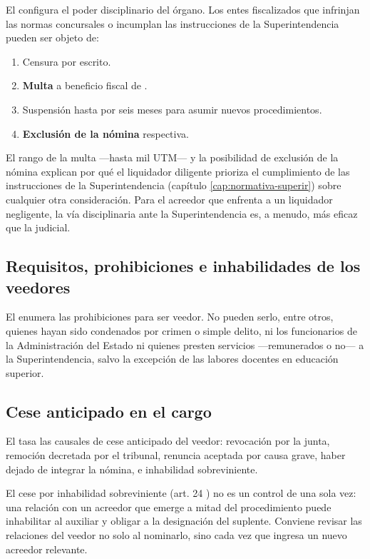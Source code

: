 El  configura el poder disciplinario del órgano. Los entes fiscalizados que
infrinjan las normas concursales o incumplan las instrucciones de la Superintendencia pueden
ser objeto de:

\begin{enumerate}
  \item Censura por escrito.
  \item \textbf{Multa} a beneficio fiscal de .
  \item Suspensión hasta por seis meses para asumir nuevos procedimientos.
  \item \textbf{Exclusión de la nómina} respectiva.
\end{enumerate}

\begin{foco}
El rango de la multa ---hasta mil UTM--- y la posibilidad de exclusión de la nómina explican
por qué el liquidador diligente prioriza el cumplimiento de las instrucciones de la
Superintendencia (capítulo \ref{cap:normativa-superir}) sobre cualquier otra consideración.
Para el acreedor que enfrenta a un liquidador negligente, la vía disciplinaria ante la
Superintendencia es, a menudo, más eficaz que la judicial.
\end{foco}

\subsection{Requisitos, prohibiciones e inhabilidades de los veedores}

El  enumera las prohibiciones para ser veedor. No pueden serlo, entre otros, quienes
hayan sido condenados por crimen o simple delito, ni los funcionarios de la Administración del
Estado ni quienes presten servicios ---remunerados o no--- a la Superintendencia, salvo la
excepción de las labores docentes en educación superior.

\subsection{Cese anticipado en el cargo}

El  tasa las causales de cese anticipado del veedor: revocación por la junta, remoción
decretada por el tribunal, renuncia aceptada por causa grave, haber dejado de integrar la
nómina, e inhabilidad sobreviniente.

\begin{practica}
El cese por inhabilidad sobreviniente (art. 24 ) no es un control de una sola vez: una
relación con un acreedor que emerge a mitad del procedimiento puede inhabilitar al auxiliar y
obligar a la designación del suplente. Conviene revisar las relaciones del veedor no solo al
nominarlo, sino cada vez que ingresa un nuevo acreedor relevante.
\end{practica}


